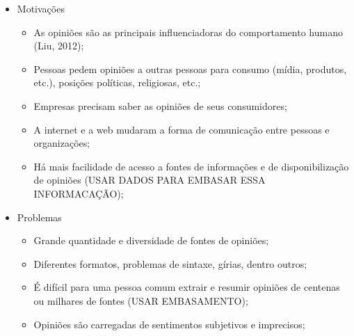 \documentclass[msc, a4paper, classic, pt]{ufbathesis}
\begin{document}
\mainmatter

% 
% 
% 
%


\begin{itemize}

\item Motivações
\begin{itemize}
\item As opiniões são as principais influenciadoras do comportamento humano (Liu, 2012);
\item Pessoas pedem opiniões a outras pessoas para consumo (mídia, produtos, etc.), posições políticas, religiosas, etc.;
\item Empresas precisam saber as opiniões de seus consumidores;
\item A internet e a web mudaram a forma de comunicação entre pessoas e organizações;
\item Há mais facilidade de acesso a fontes de informações e de disponibilização de opiniões (USAR DADOS PARA EMBASAR ESSA INFORMACAÇÃO);
\end{itemize}

\item Problemas
\begin{itemize}
\item Grande quantidade e diversidade de fontes de opiniões;
\item Diferentes formatos, problemas de sintaxe, gírias, dentro outros;
\item É difícil para uma pessoa comum extrair e resumir opiniões de centenas ou milhares de fontes (USAR EMBASAMENTO);
\item Opiniões são carregadas de sentimentos subjetivos e imprecisos;
\end{itemize}


\end{itemize}
\end{document}
